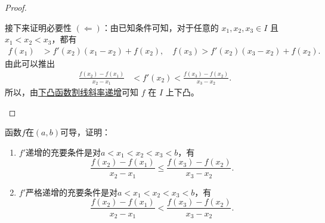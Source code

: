 \documentclass[../../main.tex]{subfiles}%
\begin{document}
\begin{proof}
\begin{enumerate}
\begin{enumerate}[(1)]
接下来证明必要性 $(\Leftarrow)$：由已知条件可知，对于任意的 $x_1,x_2,x_3\in I$ 且 $x_1 < x_2 < x_3$，都有
\begin{align*}
f(x_1) &> f'(x_2)(x_1 - x_2) + f(x_2),\quad f(x_3) > f'(x_2)(x_3 - x_2) + f(x_2).
\end{align*}
由此可以推出
\begin{align*}
\frac{f(x_2) - f(x_1)}{x_2 - x_1} &< f'(x_2) < \frac{f(x_3) - f(x_2)}{x_3 - x_2}.
\end{align*}
所以，由\hyperref[下凸函数割线斜率递增]{下凸函数割线斜率递增}可知 $f$ 在 $I$ 上下凸。
\end{enumerate}
\end{enumerate}

\end{proof}

\begin{proposition}[$\,\,$导数递增则割线斜率也递增]\label{example:导数递增则割线斜率也递增}
函数\(f\)在\((a,b)\)可导，证明：
\begin{enumerate}
\item \(f'\)递增的充要条件是对\(a < x_1 < x_2 < x_3 < b\)，有
\[
\frac{f(x_2)-f(x_1)}{x_2 - x_1}\leqslant\frac{f(x_3)-f(x_2)}{x_3 - x_2}.
\]

\item \(f'\)严格递增的充要条件是对\(a < x_1 < x_2 < x_3 < b\)，有
\[
\frac{f(x_2)-f(x_1)}{x_2 - x_1}<\frac{f(x_3)-f(x_2)}{x_3 - x_2}.
\]
\end{enumerate}
\end{proposition}
\end{document}
